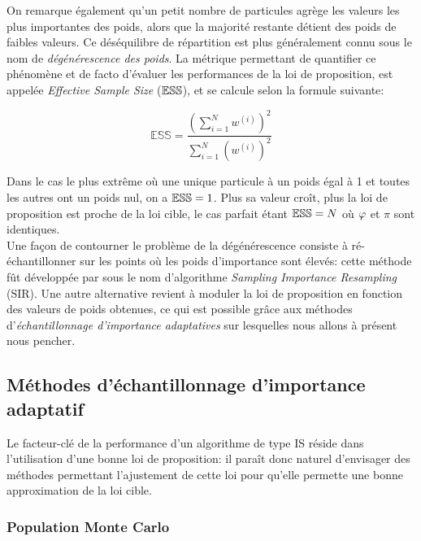  On remarque également qu'un petit nombre de particules agrège les valeurs les plus importantes des poids, alors que la majorité restante détient des poids de faibles valeurs. Ce déséquilibre de répartition est plus généralement connu sous le nom de \textit{dégénérescence des poids}. La métrique permettant de quantifier ce phénomène et de facto d'évaluer les performances de la loi de proposition, est appelée \textit{Effective Sample Size} (${\mathbb{ESS}}$), et se calcule selon la formule suivante:

\begin{equation}
\mathbb{ESS} = \dfrac{\left(\sum\limits_{i=1}^N w^{(i)}\right)^2}{\sum\limits_{i=1}^N \left(w^{(i)}\right)^2}
\label{eq_def_ESS}
\end{equation}

Dans le cas le plus extrême où une unique particule à un poids égal à 1 et toutes les autres ont un poids nul, on a ${\mathbb{ESS}} = 1$. Plus sa valeur croît, plus la loi de proposition est proche de la loi cible, le cas parfait étant ${\mathbb{ESS}} = N$ où ${\varphi}$ et $\pi$ sont identiques.\\

Une façon de contourner le problème de la dégénérescence consiste à ré-échantillonner sur les points où les poids d'importance sont élevés: cette méthode fût développée par \cite{Rubin1988} sous le nom d'algorithme \textit{Sampling Importance Resampling} (SIR). Une autre alternative  revient à moduler la loi de proposition en fonction des valeurs de poids obtenues, ce qui est possible grâce aux méthodes d'\textit{échantillonnage d'importance adaptatives} sur lesquelles nous allons à présent nous pencher.\\

\subsection{Méthodes d'échantillonnage d'importance adaptatif}

Le facteur-clé de la performance d'un algorithme de type IS réside dans l'utilisation d'une bonne loi de proposition: il paraît donc naturel d'envisager des méthodes permettant l'ajustement de cette loi pour qu'elle permette une bonne approximation de la loi cible. \\

\subsubsection{Population Monte Carlo}


